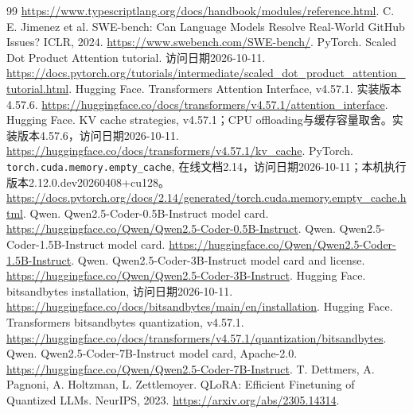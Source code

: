 \documentclass[UTF8,a4paper,11pt,fontset=fandol]{ctexart}
\begin{document}
\begin{thebibliography}{99}
\url{https://www.typescriptlang.org/docs/handbook/modules/reference.html}.
 C. E. Jimenez et al. SWE-bench: Can Language Models Resolve Real-World GitHub Issues? ICLR, 2024.
\url{https://www.swebench.com/SWE-bench/}.
 PyTorch. Scaled Dot Product Attention tutorial. 访问日期2026-10-11.
\url{https://docs.pytorch.org/tutorials/intermediate/scaled_dot_product_attention_tutorial.html}.
 Hugging Face. Transformers Attention Interface, v4.57.1. 实装版本4.57.6.
\url{https://huggingface.co/docs/transformers/v4.57.1/attention_interface}.
 Hugging Face. KV cache strategies, v4.57.1；CPU offloading与缓存容量取舍。实装版本4.57.6，访问日期2026-10-11.
\url{https://huggingface.co/docs/transformers/v4.57.1/kv_cache}.
 PyTorch. \texttt{torch.cuda.memory.empty\_cache}, 在线文档2.14，访问日期2026-10-11；本机执行版本2.12.0.dev20260408+cu128。
\url{https://docs.pytorch.org/docs/2.14/generated/torch.cuda.memory.empty_cache.html}.
 Qwen. Qwen2.5-Coder-0.5B-Instruct model card.
\url{https://huggingface.co/Qwen/Qwen2.5-Coder-0.5B-Instruct}.
 Qwen. Qwen2.5-Coder-1.5B-Instruct model card.
\url{https://huggingface.co/Qwen/Qwen2.5-Coder-1.5B-Instruct}.
 Qwen. Qwen2.5-Coder-3B-Instruct model card and license.
\url{https://huggingface.co/Qwen/Qwen2.5-Coder-3B-Instruct}.
 Hugging Face. bitsandbytes installation, 访问日期2026-10-11.
\url{https://huggingface.co/docs/bitsandbytes/main/en/installation}.
 Hugging Face. Transformers bitsandbytes quantization, v4.57.1.
\url{https://huggingface.co/docs/transformers/v4.57.1/quantization/bitsandbytes}.
 Qwen. Qwen2.5-Coder-7B-Instruct model card, Apache-2.0.
\url{https://huggingface.co/Qwen/Qwen2.5-Coder-7B-Instruct}.
 T. Dettmers, A. Pagnoni, A. Holtzman, L. Zettlemoyer. QLoRA: Efficient Finetuning of Quantized LLMs. NeurIPS, 2023.
\url{https://arxiv.org/abs/2305.14314}.
\end{thebibliography}
\end{document}
